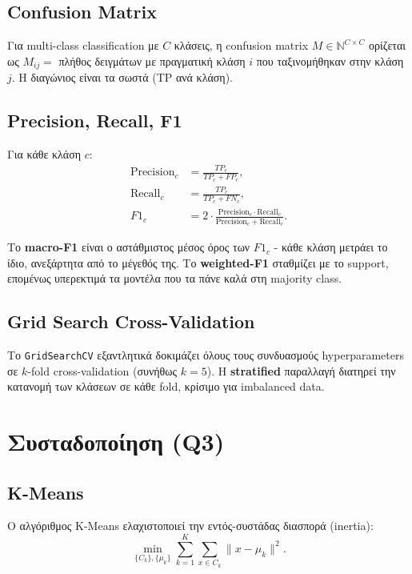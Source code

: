 \documentclass[12pt,a4paper,twoside]{book}
\begin{document}
\subsection{Confusion Matrix}

Για multi-class classification με \(C\) κλάσεις, η confusion matrix
\(M \in \mathbb{N}^{C \times C}\) ορίζεται ως
\(M_{ij} = \) πλήθος δειγμάτων με πραγματική κλάση \(i\) που ταξινομήθηκαν
στην κλάση \(j\). Η διαγώνιος είναι τα σωστά (TP ανά κλάση).

\subsection{Precision, Recall, F1}

Για κάθε κλάση \(c\):
\begin{align}
    \text{Precision}_c &= \frac{TP_c}{TP_c + FP_c}, \\
    \text{Recall}_c    &= \frac{TP_c}{TP_c + FN_c}, \\
    F1_c               &= 2 \cdot \frac{\text{Precision}_c \cdot \text{Recall}_c}
                                        {\text{Precision}_c + \text{Recall}_c}.
\end{align}

Το \textbf{macro-F1} είναι ο αστάθμιστος μέσος όρος των \(F1_c\) -
κάθε κλάση μετράει το ίδιο, ανεξάρτητα από το μέγεθός της. Το
\textbf{weighted-F1} σταθμίζει με το support, επομένως υπερεκτιμά τα
μοντέλα που τα πάνε καλά στη majority class.

\subsection{Grid Search Cross-Validation}

Το \texttt{GridSearchCV} εξαντλητικά δοκιμάζει όλους τους συνδυασμούς
hyperparameters σε \(k\)-fold cross-validation (συνήθως \(k=5\)). Η
\textbf{stratified} παραλλαγή διατηρεί την κατανομή των κλάσεων σε κάθε
fold, κρίσιμο για imbalanced data.

\section{Συσταδοποίηση (Q3)}

\subsection{K-Means}

Ο αλγόριθμος K-Means ελαχιστοποιεί την εντός-συστάδας διασπορά (inertia):
\begin{equation}
    \min_{\{C_k\}, \{\mu_k\}} \sum_{k=1}^{K} \sum_{x \in C_k} \|x - \mu_k\|^2.
\end{equation}
\end{document}
